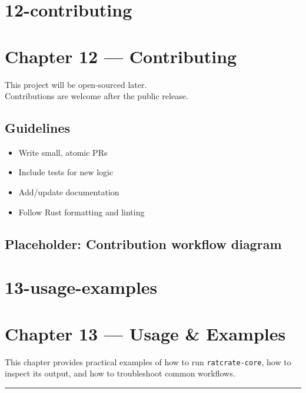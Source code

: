 \documentclass[
  letterpaper,
  DIV=11,
  numbers=noendperiod]{scrreprt}
\providecommand{\tightlist}{%
  \setlength{\itemsep}{0pt}\setlength{\parskip}{0pt}}
\begin{document}
\chapter{12-contributing}\label{contributing}

\chapter{Chapter 12 --- Contributing}\label{chapter-12-contributing}

This project will be open-sourced later.\\
Contributions are welcome after the public release.

\section{Guidelines}\label{guidelines}

\begin{itemize}
\tightlist
\item
  Write small, atomic PRs\\
\item
  Include tests for new logic\\
\item
  Add/update documentation\\
\item
  Follow Rust formatting and linting
\end{itemize}

\section{Placeholder: Contribution workflow
diagram}\label{placeholder-contribution-workflow-diagram}

\chapter{13-usage-examples}\label{usage-examples}

\chapter{Chapter 13 --- Usage \&
Examples}\label{chapter-13-usage-examples}

This chapter provides practical examples of how to run
\texttt{ratcrate-core}, how to inspect its output, and how to
troubleshoot common workflows.

\begin{center}\rule{0.5\linewidth}{0.5pt}\end{center}
\end{document}
